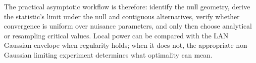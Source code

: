 \documentclass[12pt,oneside]{book}
\numberwithin{equation}{section}
\theoremstyle{definition}
\theoremstyle{plain}
\theoremstyle{remark}
\begin{document}
The practical asymptotic workflow is therefore: identify the null geometry,
derive the statistic's limit under the null and contiguous alternatives,
verify whether convergence is uniform over nuisance parameters, and only then
choose analytical or resampling critical values.  Local power can be compared
with the LAN Gaussian envelope when regularity holds; when it does not, the
appropriate non-Gaussian limiting experiment determines what optimality can
mean.
\end{document}
